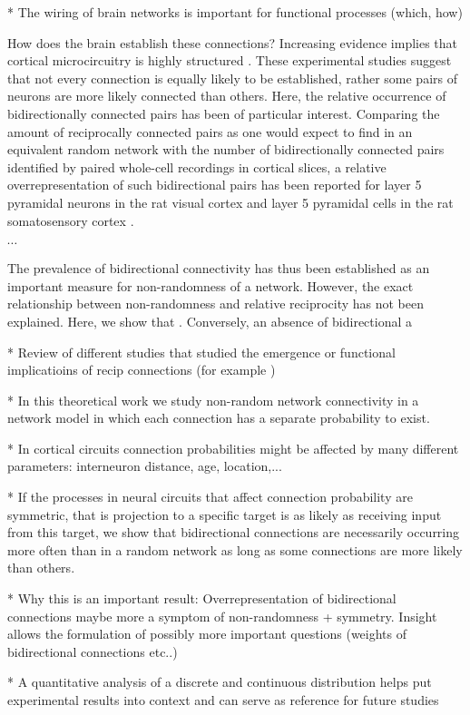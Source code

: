 
* The wiring of brain networks is important for functional processes (which, how)

How does the brain establish these connections? Increasing evidence implies that cortical microcircuitry is highly structured \cite{Song2005,Perin2011}. These experimental studies suggest that not every connection is equally likely to be established, rather some pairs of neurons are more likely connected than others. Here, the relative occurrence of bidirectionally connected pairs has been of particular interest. Comparing the amount of reciprocally connected pairs as one would expect to find in an equivalent random network with the number of bidirectionally connected pairs identified by paired whole-cell recordings in cortical slices, a relative overrepresentation of such bidirectional pairs has been reported for layer 5 pyramidal neurons in the rat visual cortex \cite{Song2005} and layer 5 pyramidal cells in the rat somatosensory cortex \cite{Markram1997,Perin2011}.

$\cdots$

The prevalence of bidirectional connectivity has thus been established as an important measure for non-randomness of a network. However, the exact relationship between non-randomness and relative reciprocity has not been explained. Here, we show that . Conversely, an absence of bidirectional a


* Review of different studies that studied the emergence or functional implicatioins of recip connections (for example \cite{Clopath2010})

* In this theoretical work we study non-random network connectivity in a network model in which each connection has a separate probability to exist.

* In cortical circuits connection probabilities might be affected by many different parameters: interneuron distance, age, location,...

* If the processes in neural circuits that affect connection probability are symmetric, that is projection to a specific target is as likely as receiving input from this target, we show that bidirectional connections are necessarily occurring more often than in a random network as long as some connections are more likely than others.

* Why this is an important result: Overrepresentation of bidirectional connections maybe more a symptom of non-randomness + symmetry. Insight allows the formulation of possibly more important questions (weights of bidirectional connections etc..)

* A quantitative analysis of a discrete and continuous distribution helps put experimental results into context and can serve as reference for future studies



